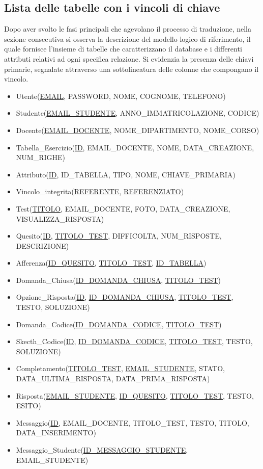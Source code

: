 \documentclass{article}
\begin{document}
\subsection{Lista delle tabelle con i vincoli di chiave}
\large
Dopo aver svolto le fasi principali che agevolano il processo di traduzione, nella sezione consecutiva si osserva la descrizione del modello logico di riferimento, il quale fornisce l'insieme di tabelle che caratterizzano il database e i differenti attributi relativi ad ogni specifica relazione. Si evidenzia la presenza delle chiavi primarie, segnalate attraverso una sottolineatura delle colonne che compongano il vincolo.\vspace*{7pt}
\begin{itemize}[label={ }, leftmargin=*, wide=1pt]
    \itemsep0em
    \item Utente(\underline{EMAIL}, PASSWORD, NOME, COGNOME, TELEFONO)
    \item Studente(\underline{EMAIL\_STUDENTE}, ANNO\_IMMATRICOLAZIONE, CODICE)
    \item Docente(\underline{EMAIL\_DOCENTE}, NOME\_DIPARTIMENTO, NOME\_CORSO)
    \item Tabella\_Esercizio(\underline{ID}, EMAIL\_DOCENTE, NOME, DATA\_CREAZIONE, NUM\_RIGHE)
    \item Attributo(\underline{ID}, ID\_TABELLA, TIPO, NOME, CHIAVE\_PRIMARIA)
    \item Vincolo\_integrita(\underline{REFERENTE}, \underline{REFERENZIATO})
    \item Test(\underline{TITOLO}, EMAIL\_DOCENTE, FOTO, DATA\_CREAZIONE, VISUALIZZA\_RISPOSTA)
    \item Quesito(\underline{ID}, \underline{TITOLO\_TEST}, DIFFICOLTA, NUM\_RISPOSTE, DESCRIZIONE)
    \item Afferenza(\underline{ID\_QUESITO}, \underline{TITOLO\_TEST}, \underline{ID\_TABELLA})
    \item Domanda\_Chiusa(\underline{ID\_DOMANDA\_CHIUSA}, \underline{TITOLO\_TEST})
    \item Opzione\_Risposta(\underline{ID}, \underline{ID\_DOMANDA\_CHIUSA}, \underline{TITOLO\_TEST}, TESTO, SOLUZIONE)
    \item Domanda\_Codice(\underline{ID\_DOMANDA\_CODICE}, \underline{TITOLO\_TEST})
    \item Skecth\_Codice(\underline{ID}, \underline{ID\_DOMANDA\_CODICE}, \underline{TITOLO\_TEST}, TESTO, SOLUZIONE)
    \item Completamento(\underline{TITOLO\_TEST}, \underline{EMAIL\_STUDENTE}, STATO, DATA\_ULTIMA\_RISPOSTA, DATA\_PRIMA\_RISPOSTA)
    \item Risposta(\underline{EMAIL\_STUDENTE}, \underline{ID\_QUESITO}, \underline{TITOLO\_TEST}, TESTO, ESITO)
    \item Messaggio(\underline{ID}, EMAIL\_DOCENTE, TITOLO\_TEST, TESTO, TITOLO, DATA\_INSERIMENTO)
    \item Messaggio\_Studente(\underline{ID\_MESSAGGIO\_STUDENTE}, EMAIL\_STUDENTE)
\end{itemize}
\end{document}
